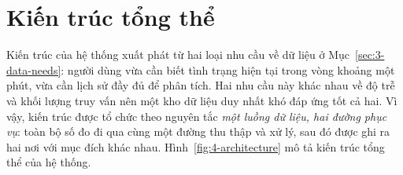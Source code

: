 \section{Kiến trúc tổng thể}
\label{sec:4-architecture}

Kiến trúc của hệ thống xuất phát từ hai loại nhu cầu về dữ liệu ở Mục~\ref{sec:3-data-needs}: người dùng vừa cần biết tình trạng hiện tại trong vòng khoảng một phút, vừa cần lịch sử đầy đủ để phân tích. Hai nhu cầu này khác nhau về độ trễ và khối lượng truy vấn nên một kho dữ liệu duy nhất khó đáp ứng tốt cả hai. Vì vậy, kiến trúc được tổ chức theo nguyên tắc \emph{một luồng dữ liệu, hai đường phục vụ}: toàn bộ số đo đi qua cùng một đường thu thập và xử lý, sau đó được ghi ra hai nơi với mục đích khác nhau. Hình~\ref{fig:4-architecture} mô tả kiến trúc tổng thể của hệ thống.

